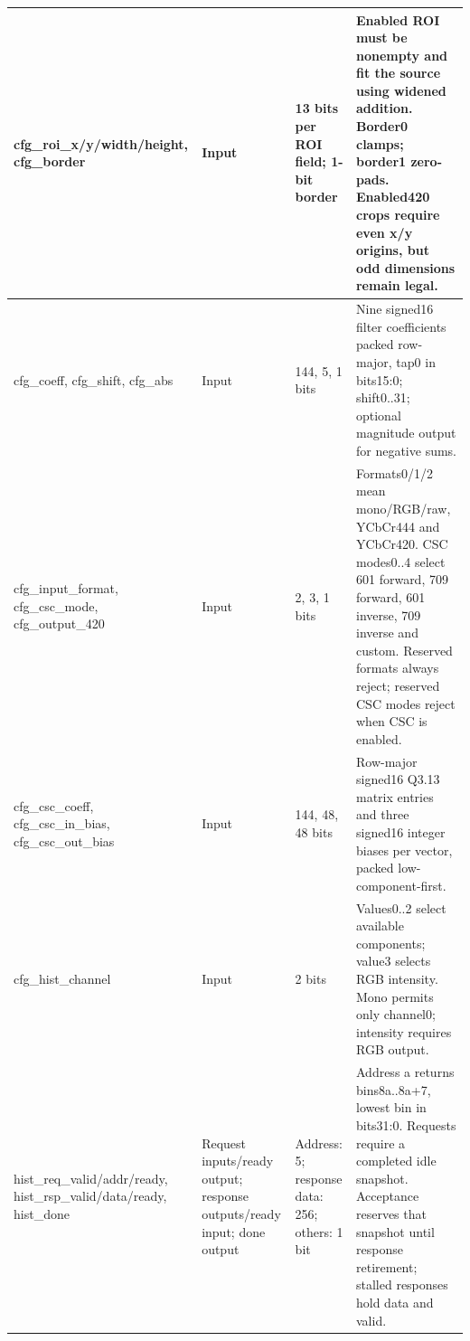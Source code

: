 \documentclass[11pt,a4paper]{article}
\begin{document}
{\begin{longtable}{@{}L{0.21\textwidth}|L{0.12\textwidth}|L{0.12\textwidth}|L{0.45\textwidth}@{}}
cfg\_\allowbreak{}roi\_\allowbreak{}x/\allowbreak{}y/\allowbreak{}width/\allowbreak{}height,\allowbreak{} cfg\_\allowbreak{}border & Input & 13 bits per ROI field; 1-bit border & Enabled ROI must be nonempty and fit the source using widened addition. Border0 clamps; border1 zero-pads. Enabled4\allowbreak{}20 crops require even x/\allowbreak{}y origins,\allowbreak{} but odd dimensions remain legal.\\[2pt]\hline

cfg\_\allowbreak{}coeff,\allowbreak{} cfg\_\allowbreak{}shift,\allowbreak{} cfg\_\allowbreak{}abs & Input & 144,\allowbreak{} 5,\allowbreak{} 1 bits & Nine signed16 filter coefficients packed row-major,\allowbreak{} tap0 in bits15:0; shift0..31; optional magnitude output for negative sums.\\[2pt]\hline

cfg\_\allowbreak{}input\_\allowbreak{}format,\allowbreak{} cfg\_\allowbreak{}csc\_\allowbreak{}mode,\allowbreak{} cfg\_\allowbreak{}output\_\allowbreak{}420 & Input & 2,\allowbreak{} 3,\allowbreak{} 1 bits & Formats0/\allowbreak{}1/\allowbreak{}2 mean mono/\allowbreak{}RGB/\allowbreak{}raw,\allowbreak{} YCbCr444 and YCbCr420. CSC modes0..4 select 601 forward,\allowbreak{} 709 forward,\allowbreak{} 601 inverse,\allowbreak{} 709 inverse and custom. Reserved formats always reject; reserved CSC modes reject when CSC is enabled.\\[2pt]\hline

cfg\_\allowbreak{}csc\_\allowbreak{}coeff,\allowbreak{} cfg\_\allowbreak{}csc\_\allowbreak{}in\_\allowbreak{}bias,\allowbreak{} cfg\_\allowbreak{}csc\_\allowbreak{}out\_\allowbreak{}bias & Input & 144,\allowbreak{} 48,\allowbreak{} 48 bits & Row-major signed16 Q3.13 matrix entries and three signed16 integer biases per vector,\allowbreak{} packed low-component-first.\\[2pt]\hline

cfg\_\allowbreak{}hist\_\allowbreak{}channel & Input & 2 bits & Values0..2 select available components; value3 selects RGB intensity. Mono permits only channel0; intensity requires RGB output.\\[2pt]\hline

hist\_\allowbreak{}req\_\allowbreak{}valid/\allowbreak{}addr/\allowbreak{}ready,\allowbreak{} hist\_\allowbreak{}rsp\_\allowbreak{}valid/\allowbreak{}data/\allowbreak{}ready,\allowbreak{} hist\_\allowbreak{}done & Request inputs/\allowbreak{}ready output; response outputs/\allowbreak{}ready input; done output & Address: 5; response data: 256; others: 1 bit & Address a returns bins8a..8a+\allowbreak{}7,\allowbreak{} lowest bin in bits31:0. Requests require a completed idle snapshot. Acceptance reserves that snapshot until response retirement; stalled responses hold data and valid.\\[2pt]\hline

\bottomrule\end{longtable}}
\end{document}
